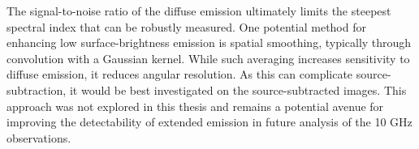 The signal-to-noise ratio of the diffuse emission ultimately limits the steepest spectral index that can be robustly measured. One potential method for enhancing low surface-brightness emission is spatial smoothing, typically through convolution with a Gaussian kernel. While such averaging increases sensitivity to diffuse emission, it reduces angular resolution. As this can complicate source-subtraction, it would be best investigated on the source-subtracted images. This approach was not explored in this thesis and remains a potential avenue for improving the detectability of extended emission in future analysis of the 10 GHz observations.
